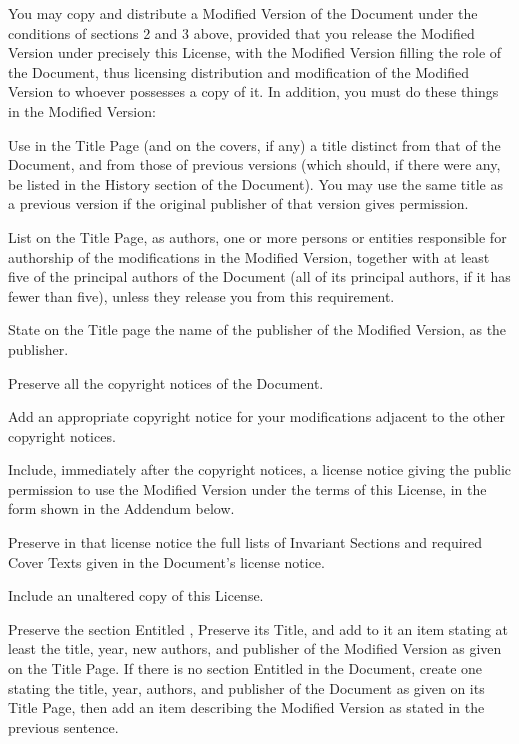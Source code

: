 You may copy and distribute a Modified Version of the Document under
the conditions of sections 2 and 3 above, provided that you release
the Modified Version under precisely this License, with the Modified
Version filling the role of the Document, thus licensing distribution
and modification of the Modified Version to whoever possesses a copy
of it.  In addition, you must do these things in the Modified Version:

\startitemize[A]
\item[A.]
   Use in the Title Page (and on the covers, if any) a title distinct
   from that of the Document, and from those of previous versions
   (which should, if there were any, be listed in the History section
   of the Document).  You may use the same title as a previous version
   if the original publisher of that version gives permission.

\item[B.]
   List on the Title Page, as authors, one or more persons or entities
   responsible for authorship of the modifications in the Modified
   Version, together with at least five of the principal authors of the
   Document (all of its principal authors, if it has fewer than five),
   unless they release you from this requirement.

\item[C.]
   State on the Title page the name of the publisher of the
   Modified Version, as the publisher.

\item[D.]
   Preserve all the copyright notices of the Document.

\item[E.]
   Add an appropriate copyright notice for your modifications
   adjacent to the other copyright notices.

\item[F.]
   Include, immediately after the copyright notices, a license notice
   giving the public permission to use the Modified Version under the
   terms of this License, in the form shown in the Addendum below.

\item[G.]
   Preserve in that license notice the full lists of Invariant Sections
   and required Cover Texts given in the Document's license notice.

\item[H.]
   Include an unaltered copy of this License.

\item[I.]
   Preserve the section Entitled , Preserve its Title, and add
   to it an item stating at least the title, year, new authors, and
   publisher of the Modified Version as given on the Title Page.  If
   there is no section Entitled  in the Document, create one
   stating the title, year, authors, and publisher of the Document as
   given on its Title Page, then add an item describing the Modified
   Version as stated in the previous sentence.


